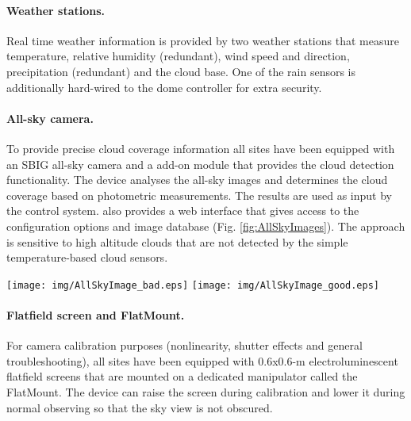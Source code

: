 \paragraph{Weather stations.}
Real time weather information is provided by two weather stations that measure temperature, relative humidity (redundant), wind speed and direction, precipitation (redundant) and the cloud base. One of the rain sensors is additionally hard-wired to the dome controller for extra security. 

\paragraph{All-sky camera.}

To provide precise cloud coverage information all sites have been equipped with an SBIG all-sky camera and a \twopiskytm add-on module that provides the cloud detection functionality. The device analyses the all-sky images and determines the cloud coverage based on photometric measurements. The results are used as input by the control system. \twopiskytm also provides a web interface that gives access to the configuration options and image database (Fig. \ref{fig:AllSkyImages}). The approach is sensitive to high altitude clouds that are not detected by the simple temperature-based  cloud sensors. 

\begin{figure*}[htb!]
\begin{center}
\texttt{[image: img/AllSkyImage\_bad.eps]}
\texttt{[image: img/AllSkyImage\_good.eps]}
\caption{Sample all sky images obtained with the all-sky monitoring system installed in Colmplejo Astronomico El Leoncito in Argentina. Each of the 60 second exposures shows different cloud coverages. Green circles denote stars properly detected and identified in the catalog, red circles denote stars obscured by clouds.}
\label{fig:AllSkyImages}
\end{center}
\end{figure*}


\paragraph{Flatfield screen and FlatMount.}
For camera calibration purposes (nonlinearity, shutter effects and general troubleshooting), all sites have been equipped with 0.6x0.6-m electroluminescent flatfield screens that are mounted on a dedicated manipulator called the FlatMount. The device can raise the screen during calibration and lower it during normal observing so that the sky view is not obscured. 

